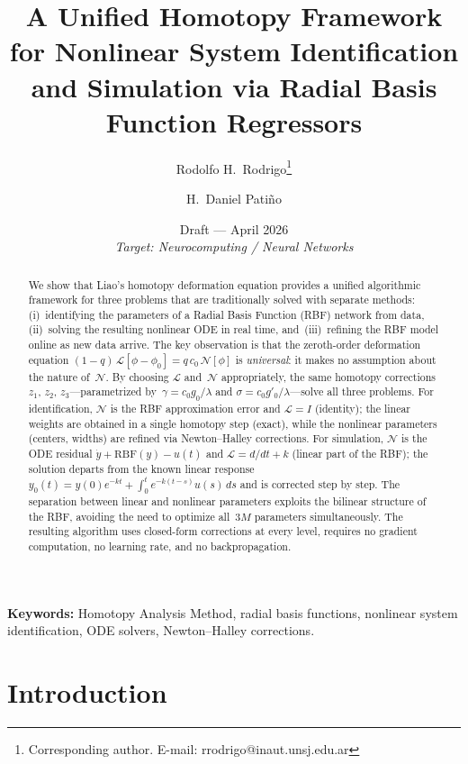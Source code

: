 \documentclass[11pt,a4paper]{article}
\title{\textbf{A Unified Homotopy Framework for Nonlinear System Identification and Simulation via Radial Basis Function Regressors}}
\author[1]{Rodolfo H.\ Rodrigo\thanks{Corresponding author. E-mail: rrodrigo@inaut.unsj.edu.ar}}
\author[1]{H.\ Daniel Pati\~no}
\affil[1]{INAUT, Universidad Nacional de San Juan -- CONICET, San Juan, Argentina}
\date{\small Draft --- April 2026\\[4pt]
\small\textit{Target: Neurocomputing / Neural Networks}}
\begin{document}
\maketitle
\thispagestyle{fancy}

\begin{abstract}
We show that Liao's homotopy deformation equation provides a unified algorithmic framework for three problems that are traditionally solved with separate methods: (i)~identifying the parameters of a Radial Basis Function (RBF) network from data, (ii)~solving the resulting nonlinear ODE in real time, and~(iii)~refining the RBF model online as new data arrive. The key observation is that the zeroth-order deformation equation $(1-q)\,\mathcal{L}[\phi - \phi_0] = q\,c_0\,\mathcal{N}[\phi]$ is \emph{universal}: it makes no assumption about the nature of~$\mathcal{N}$. By choosing $\mathcal{L}$ and~$\mathcal{N}$ appropriately, the same homotopy corrections $z_1$, $z_2$, $z_3$---parametrized by~$\gamma = c_0 g_0/\lambda$ and $\sigma = c_0 g'_0/\lambda$---solve all three problems. For identification, $\mathcal{N}$ is the RBF approximation error and $\mathcal{L} = I$ (identity); the linear weights are obtained in a single homotopy step (exact), while the nonlinear parameters (centers, widths) are refined via Newton--Halley corrections. For simulation, $\mathcal{N}$ is the ODE residual $\dot{y} + \mathrm{RBF}(y) - u(t)$ and $\mathcal{L} = d/dt + k$ (linear part of the RBF); the solution departs from the known linear response $y_0(t) = y(0)e^{-kt} + \int_0^t e^{-k(t-s)}u(s)\,ds$ and is corrected step by step. The separation between linear and nonlinear parameters exploits the bilinear structure of the RBF, avoiding the need to optimize all~$3M$ parameters simultaneously. The resulting algorithm uses closed-form corrections at every level, requires no gradient computation, no learning rate, and no backpropagation.
\end{abstract}

\noindent\textbf{Keywords:} Homotopy Analysis Method, radial basis functions, nonlinear system identification, ODE solvers, Newton--Halley corrections.

\section{Introduction}
\label{sec:intro}
\end{document}
